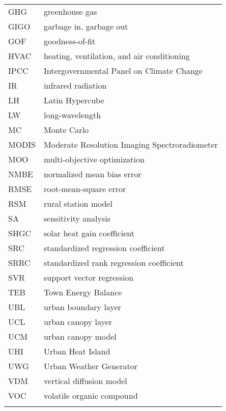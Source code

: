 \noindent
\begin{tabular}{p{3.5cm}p{11.5cm}}
GHG & greenhouse gas\\
GIGO & garbage in, garbage out\\
GOF & goodness-of-fit\\
HVAC & heating, ventilation, and air conditioning\\
IPCC & Intergovernmental Panel on Climate Change\\
IR & infrared radiation\\
LH & Latin Hypercube\\
LW & long-wavelength\\
MC & Monte Carlo\\
MODIS & Moderate Resolution Imaging Spectroradiometer \\
MOO & multi-objective optimization\\
NMBE & normalized mean bias error\\
RMSE & root-mean-square error \\
RSM & rural station model \\
SA & sensitivity analysis \\
SHGC & solar heat gain coefficient \\
SRC & standardized regression coefficient \\
SRRC & standardized rank regression coefficient \\
SVR & support vector regression\\
TEB & Town Energy Balance\\
UBL & urban boundary layer \\
UCL & urban canopy layer\\
UCM & urban canopy model \\
UHI & Urban Heat Island\\
UWG & Urban Weather Generator\\
VDM & vertical diffusion model\\
VOC & volatile organic compound\\
\multicolumn{2}{c}{}
\end{tabular}


\newpage
\mbox{}